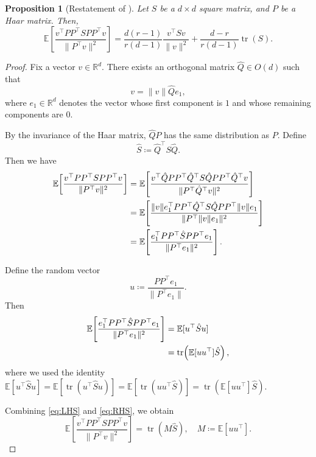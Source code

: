 \documentclass[10pt]{article}
\newtheorem{proposition}[proposition]{Proposition}
\begin{document}
\begin{proposition}[Restatement of ]
\label{app:prop:secondterm}
Let $S$ be a $d\times d$ square matrix, and $P$ be a Haar matrix. Then,
\[
\mathbb{E}\left[\frac{v^\top PP^\top S PP^\top v}{\|P^\top v\|^2}\right]
=
\frac{d(r-1)}{r(d-1)}\frac{v^\top Sv}{\|v\|^2}
+\frac{d-r}{r(d-1)}\operatorname{tr}(S).
\]
\end{proposition}
\begin{proof}
Fix a vector $v \in \mathbb{R}^d$.  
There exists an orthogonal matrix $\hat Q \in O(d)$ such that
\[
v = \|v\| \hat Q e_1,
\]
where $e_1 \in \mathbb{R}^d$ denotes the vector whose first component is $1$ and whose remaining components are $0$.

By the invariance of the Haar matrix, $\hat Q P$ has the same distribution as $P$.  
Define
\[
\hat S \coloneqq \hat Q^\top S \hat Q .
\]
Then we have
\begin{align}
\mathbb{E}\!\left[\frac{v^\top PP^\top S PP^\top v}{\|P^\top v\|^2}\right]
&= \mathbb{E}\!\left[\frac{v^\top \hat Q PP^\top \hat Q^\top S \hat Q PP^\top \hat Q^\top v}{\|P^\top \hat Q^\top v\|^2}\right] \notag\\
&= \mathbb{E}\!\left[\frac{\|v\| e_1^\top PP^\top \hat Q^\top S \hat Q PP^\top \|v\| e_1}{\|P^\top \|v\| e_1\|^2}\right] \notag\\
&= \mathbb{E}\!\left[\frac{e_1^\top PP^\top \hat S PP^\top e_1}{\|P^\top e_1\|^2}\right].
\label{eq:LHS}
\end{align}

Define the random vector
\[
u \coloneqq \frac{PP^\top e_1}{\|P^\top e_1\|}.
\]
Then
\begin{align}
\mathbb{E}\!\left[\frac{e_1^\top PP^\top \hat S PP^\top e_1}{\|P^\top e_1\|^2}\right]
&= \mathbb{E}[u^\top \hat S u] \notag\\
&= \operatorname{tr}\!\left(\mathbb{E}[uu^\top]\hat S\right),
\label{eq:RHS}
\end{align}
where we used the identity
$\mathbb{E}[u^\top \hat S u]
= \mathbb{E}[\operatorname{tr}(u^\top \hat S u)]
= \mathbb{E}[\operatorname{tr}(uu^\top \hat S)]
= \operatorname{tr}(\mathbb{E}[uu^\top]\hat S)$.

Combining \eqref{eq:LHS} and \eqref{eq:RHS}, we obtain
\[
\mathbb{E}\!\left[\frac{v^\top PP^\top S PP^\top v}{\|P^\top v\|^2}\right]
= \operatorname{tr}(M\hat S),
\quad
M \coloneqq \mathbb{E}[uu^\top].
\]


\end{proof}
\end{document}
